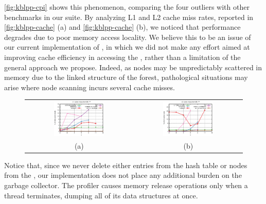 \myfigure\ref{fig:kblpp-cpi} shows this phenomenon, comparing the four outliers with other benchmarks in our suite. By analyzing L1 and L2 cache miss rates, reported in \myfigure\ref{fig:kblpp-cache} (a) and \myfigure\ref{fig:kblpp-cache} (b), we noticed that performance degrades due to poor memory access locality. We believe this to be an issue of our current implementation of \kblpp, in which we did not make any effort aimed at improving cache efficiency in accessing the \ksf, rather than a limitation of the general approach we propose. Indeed, as nodes may be unpredictably scattered in memory due to the linked structure of the forest, pathological situations may arise where node scanning incurs several cache misses.

\ifdefined\noauthorea
\begin{figure}[!ht]
\begin{center}
\begin{tabular}{cc}
\hspace{-6mm}
\includegraphics[width=0.49\textwidth]{figures/kblpp-cache/kblpp-cache-L1.eps} &
\includegraphics[width=0.49\textwidth]{figures/kblpp-cache/kblpp-cache-L2.eps}\\
(a) & (b)
\end{tabular}
\caption{\protect}
\end{center}
\end{figure}
\fi

Notice that, since we never delete either entries from the hash table or nodes from the \ksf, our implementation does not place any additional burden on the garbage collector. The profiler causes memory release operations only when a thread terminates, dumping all of its data structures at once.

